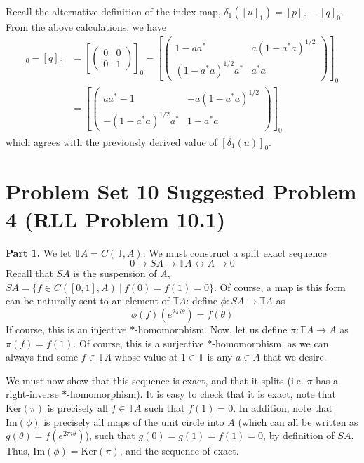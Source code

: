 \documentclass[aps,pra,showpacs,notitlepage,onecolumn,superscriptaddress,nofootinbib]{revtex4-1}
\theoremstyle{definition}
\begin{document}
Recall the alternative definition of the index map, $\delta_1([u]_1) = [p]_0 - [q]_0$. From the above calculations, we have
\begin{align}
  [p]_0 - [q]_0 &= \left[ \begin{pmatrix} 0 & 0 \\ 0 & 1 \end{pmatrix} \right]_0 - \left[ \begin{pmatrix} 1 - a a^{*} & a (1 - a^{*} a)^{1/2} \\ (1 - a^{*} a)^{1/2} a^{*} & a^{*} a \end{pmatrix}  \right]_0
  \\ & = \left[ \begin{pmatrix} a a^{*} - 1 & -a(1 - a^{*} a)^{1/2} \\ -(1 - a^{*} a)^{1/2} a^{*} & 1 - a^{*} a \end{pmatrix} \right]_0
\end{align}
which agrees with the previously derived value of $[\delta_1(u)]_0$.

\section{Problem Set 10 Suggested Problem 4 (RLL Problem 10.1)}

\noindent \textbf{Part 1.} We let $\mathbb{T}A = C(\mathbb{T}, A)$. We must construct a split exact sequence
\begin{equation}
  0 \longrightarrow SA \longrightarrow \mathbb{T} A \longleftrightarrow A \longrightarrow 0
\end{equation}
Recall that $SA$ is the suspension of $A$, $SA = \{f \in C([0, 1], A) \ | \ f(0) = f(1) = 0\}$. Of course, a map
is this form can be naturally sent to an element of $\mathbb{T} A$: define $\phi : SA \rightarrow \mathbb{T} A$ as
\begin{equation}
  \phi(f)(e^{2 \pi i \theta}) = f \left( \theta \right)
\end{equation}
If course, this is an injective $*$-homomorphism. Now, let us define $\pi : \mathbb{T} A \rightarrow A$ as $\pi(f) = f(1)$.
Of course, this is a surjective $*$-homomorphism, as we can always find some $f \in \mathbb{T} A$ whose value at $1 \in \mathbb{T}$
is any $a \in A$ that we desire.
\newline

\noindent We must now show that this sequence is exact, and that it splits (i.e. $\pi$ has a right-inverse $*$-homomorphism). It is easy
to check that it is exact, note that $\text{Ker}(\pi)$ is precisely all $f \in \mathbb{T} A$ such that $f(1) = 0$. In addition,
note that $\text{Im}(\phi)$ is precisely all maps of the unit circle into $A$ (which can all be written as $g(\theta) = f(e^{2 \pi i \theta})$),
such that $g(0) = g(1) = f(1) = 0$, by definition of $SA$. Thus, $\text{Im}(\phi) = \text{Ker}(\pi)$, and the sequence of exact.
\newline
\end{document}
